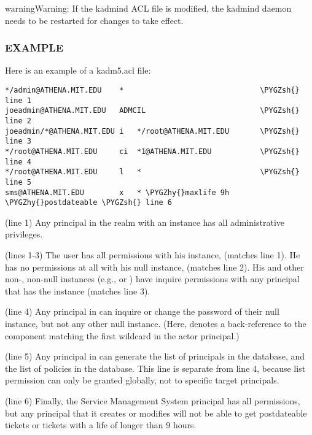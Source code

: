 \documentclass[letterpaper,10pt,english]{sphinxmanual}
\def\PYGZsh{\char`\#}
\def\PYGZhy{\char`\-}
\begin{document}
\begin{notice}{warning}{Warning:}
If the kadmind ACL file is modified, the kadmind daemon needs to be
restarted for changes to take effect.
\end{notice}


\subsubsection{EXAMPLE}
\label{admin/conf_files/kadm5_acl:example}
Here is an example of a kadm5.acl file:

\begin{Verbatim}[commandchars=\\\{\}]
*/admin@ATHENA.MIT.EDU    *                               \PYGZsh{} line 1
joeadmin@ATHENA.MIT.EDU   ADMCIL                          \PYGZsh{} line 2
joeadmin/*@ATHENA.MIT.EDU i   */root@ATHENA.MIT.EDU       \PYGZsh{} line 3
*/root@ATHENA.MIT.EDU     ci  *1@ATHENA.MIT.EDU           \PYGZsh{} line 4
*/root@ATHENA.MIT.EDU     l   *                           \PYGZsh{} line 5
sms@ATHENA.MIT.EDU        x   * \PYGZhy{}maxlife 9h \PYGZhy{}postdateable \PYGZsh{} line 6
\end{Verbatim}

(line 1) Any principal in the  realm with
an  instance has all administrative privileges.

(lines 1-3) The user  has all permissions with his
 instance,  (matches line
1).  He has no permissions at all with his null instance,
 (matches line 2).  His  and other
non-, non-null instances (e.g.,  or ) have
inquire permissions with any principal that has the instance 
(matches line 3).

(line 4) Any  principal in  can inquire
or change the password of their null instance, but not any other
null instance.  (Here,  denotes a back-reference to the
component matching the first wildcard in the actor principal.)

(line 5) Any  principal in  can generate
the list of principals in the database, and the list of policies
in the database.  This line is separate from line 4, because list
permission can only be granted globally, not to specific target
principals.

(line 6) Finally, the Service Management System principal
 has all permissions, but any principal that it
creates or modifies will not be able to get postdateable tickets or
tickets with a life of longer than 9 hours.
\end{document}
